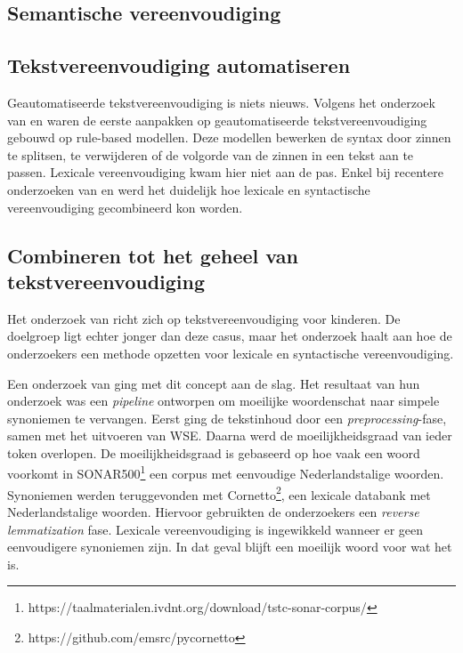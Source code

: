 \subsection{Semantische vereenvoudiging}


\subsection{Tekstvereenvoudiging automatiseren}

Geautomatiseerde tekstvereenvoudiging is niets nieuws. Volgens het onderzoek van \textcite{Canning2000} en \textcite{Siddharthan2006} waren de eerste aanpakken op geautomatiseerde tekstvereenvoudiging gebouwd op rule-based modellen. Deze modellen bewerken de syntax door zinnen te splitsen, te verwijderen of de volgorde van de zinnen in een tekst aan te passen. Lexicale vereenvoudiging kwam hier niet aan de pas. Enkel bij recentere onderzoeken van \textcite{Coster2011} en \textcite{Bulte2018} werd het duidelijk hoe lexicale en syntactische vereenvoudiging gecombineerd kon worden.

\subsection{Combineren tot het geheel van tekstvereenvoudiging}


Het onderzoek van \textcite{DeBelder2010} richt zich op tekstvereenvoudiging voor kinderen. De doelgroep ligt echter jonger dan deze casus, maar het onderzoek haalt aan hoe de onderzoekers een methode opzetten voor lexicale en syntactische vereenvoudiging.

Een onderzoek van \textcite{Bulte2018} ging met dit concept aan de slag. Het resultaat van hun onderzoek was een \textit{pipeline} ontworpen om moeilijke woordenschat naar simpele synoniemen te vervangen. Eerst ging de tekstinhoud door een \textit{preprocessing}-fase, samen met het uitvoeren van WSE. Daarna werd de moeilijkheidsgraad van ieder token overlopen. De moeilijkheidsgraad is gebaseerd op hoe vaak een woord voorkomt in SONAR500\footnote{https://taalmaterialen.ivdnt.org/download/tstc-sonar-corpus/} een corpus met eenvoudige Nederlandstalige woorden. Synoniemen werden teruggevonden met Cornetto\footnote{https://github.com/emsrc/pycornetto}, een lexicale databank met Nederlandstalige woorden. Hiervoor gebruikten de onderzoekers een \textit{reverse lemmatization} fase. Lexicale vereenvoudiging is ingewikkeld wanneer er geen eenvoudigere synoniemen zijn. In dat geval blijft een moeilijk woord voor wat het is.

